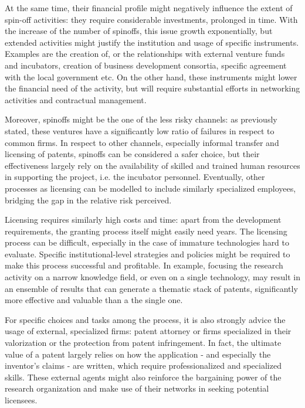 At the same time, their financial profile might negatively influence the extent of spin-off activities: they require considerable investments, prolonged in time. With the increase of the number of spinoffs, this issue growth exponentially, but extended activities might justify the institution and usage of specific instruments. Examples are the creation of, or the relationships with external venture funds and incubators, creation of business development consortia, specific agreement with the local government etc. On the other hand, these instruments might lower the financial need of the activity, but will require substantial efforts in networking activities and contractual management.

Moreover, spinoffs might be the one of the less risky channels: as previously stated, these ventures have a significantly low ratio of failures in respect to common firms. In respect to other channels, especially informal transfer and licensing of patents, spinoffs can be considered a safer choice, but their effectiveness largely rely on the availability of skilled and trained human resources in supporting the project, i.e. the incubator personnel. Eventually, other processes as licensing can be modelled to include similarly specialized employees, bridging the gap in the relative risk perceived.

Licensing requires similarly high costs and time: apart from the development requirements, the granting process itself might easily need years. The licensing process can be difficult, especially in the case of immature technologies hard to evaluate. Specific institutional-level strategies and policies might be required to make this process successful and profitable. In example, focusing the research activity on a narrow knowledge field, or even on a single technology, may result in an ensemble of results that can generate a thematic stack of patents, significantly more effective and valuable than a the single one.

For specific choices and tasks among the process, it is also strongly advice the usage of external, specialized firms: patent attorney or firms specialized in their valorization or the protection from patent infringement. In fact, the ultimate value of a patent largely relies on how the application - and especially the inventor's claims - are written, which require professionalized and specialized skills. These external agents might also reinforce the bargaining power of the research organization and make use of their networks in seeking potential licensees. 

